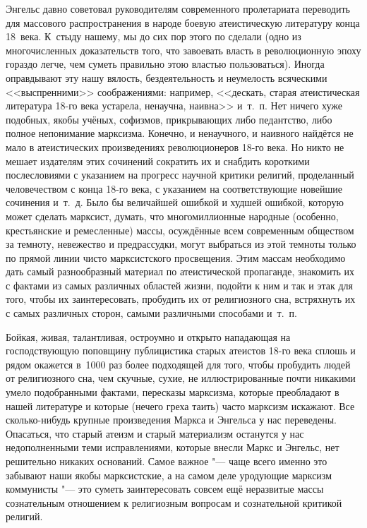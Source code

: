 Энгельс давно советовал руководителям современного пролетариата переводить
для массового распространения в народе боевую атеистическую литературу
конца 18~века. К~стыду нашему, мы до сих пор этого по сделали (одно из
многочисленных доказательств того, что завоевать власть в революционную
эпоху гораздо легче, чем суметь правильно этою властью пользоваться).
Иногда оправдывают эту нашу вялость, бездеятельность и неумелость
всяческими <<выспренними>> соображениями: например, <<дескать, старая
атеистическая литература 18-го века устарела, ненаучна, наивна>> и~т.~п. Нет
ничего хуже подобных, якобы учёных, софизмов, прикрывающих либо педантство,
либо полное непонимание марксизма. Конечно, и ненаучного, и наивного
найдётся не мало в атеистических произведениях революционеров 18-го века.
Но никто не мешает издателям этих сочинений сократить их и снабдить
короткими послесловиями с указанием на прогресс научной критики религий,
проделанный человечеством с конца 18-го века, с указанием на
соответствующие новейшие сочинения и~т.~д. Было бы величайшей ошибкой и
худшей ошибкой, которую может сделать марксист, думать, что многомиллионные
народные (особенно, крестьянские и ремесленные) массы, осуждённые всем
современным обществом за темноту, невежество и предрассудки, могут
выбраться из этой темноты только по прямой линии чисто марксистского
просвещения. Этим массам необходимо дать самый разнообразный материал по
атеистической пропаганде, знакомить их с фактами из самых различных
областей жизни, подойти к ним и так и этак для того, чтобы их
заинтересовать, пробудить их от религиозного сна, встряхнуть их с самых
различных сторон, самыми различными способами и~т.~п.

Бойкая, живая, талантливая, остроумно и открыто нападающая на господствующую
поповщину публицистика старых атеистов 18-го века сплошь и рядом окажется
в~1000 раз более подходящей для того, чтобы пробудить людей от религиозного
сна, чем скучные, сухие, не иллюстрированные почти никакими умело
подобранными фактами, пересказы марксизма, которые преобладают в нашей
литературе и которые (нечего греха таить) часто марксизм искажают. Все
сколько-нибудь крупные произведения Маркса и Энгельса у нас переведены.
Опасаться, что старый атеизм и старый материализм останутся у нас
недополненными теми исправлениями, которые внесли Маркс и Энгельс, нет
решительно никаких оснований. Самое важное "--- чаще всего именно это забывают
наши якобы марксистские, а на самом деле уродующие марксизм коммунисты
"--- это суметь заинтересовать совсем ещё неразвитые массы сознательным
отношением к религиозным вопросам и сознательной критикой религий.

